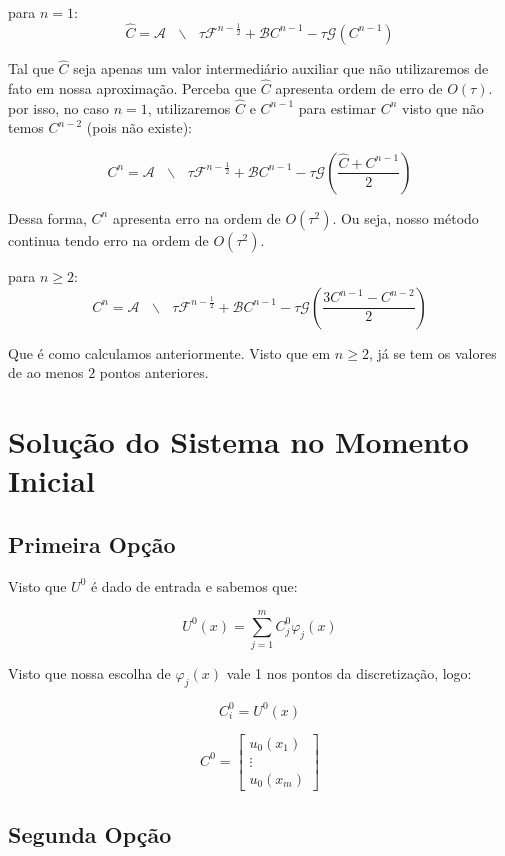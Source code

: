   para $n = 1$: \[\hat{C} = \mathcal{A}\text{ }\backslash \text{ }\tau \mathcal{F}^{n - \frac{1}{2}} + \mathcal{B}C^{n-1} - \tau\mathcal{G}(C^{n-1})\]

  Tal que $\hat{C}$ seja apenas um valor intermediário auxiliar que não utilizaremos de fato em nossa aproximação. Perceba que $\hat{C}$ apresenta ordem de erro de $O(\tau)$. por isso, no caso $n=1$, utilizaremos $\hat{C}$ e $C^{n-1}$ para estimar $C^n$ visto que não temos $C^{n-2}$ (pois não existe):

  \[C^n = \mathcal{A}\text{ }\backslash \text{ }\tau \mathcal{F}^{n - \frac{1}{2}} + \mathcal{B}C^{n-1} - \tau\mathcal{G}\left(\dfrac{\hat{C} + C^{n-1}}{2}\right)\]

  Dessa forma, $C^n$ apresenta erro na ordem de $O(\tau^2)$. Ou seja, nosso método continua tendo erro na ordem de $O(\tau^2)$.

  para $n \geq 2$: \[C^n = \mathcal{A}\text{ }\backslash \text{ }\tau \mathcal{F}^{n - \frac{1}{2}} + \mathcal{B}C^{n-1} - \tau\mathcal{G}\left(\dfrac{3C^{n-1} - C^{n-2}}{2}\right)\]

  Que é como calculamos anteriormente. Visto que em $n \geq 2$, já se tem os valores de ao menos $2$ pontos anteriores.

\section{Solução do Sistema no Momento Inicial}

\subsection*{Primeira Opção}

  Visto que $U^0$ é dado de entrada e sabemos que:

  \[U^0(x) = \sum_{j=1}^{m} C^0_j \varphi_j(x)\]

  Visto que nossa escolha de $\varphi_j(x)$ vale 1 nos pontos da discretização, logo:

  \[C^0_i = U^0(x)\]

  \[C^0 = \begin{bmatrix} u_0(x_1) \\ \vdots \\ u_0(x_m) \end{bmatrix}\]

\subsection{Segunda Opção}


